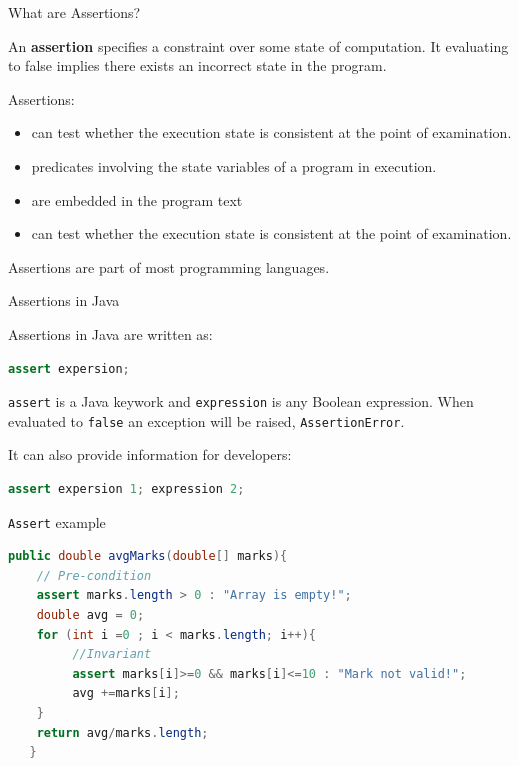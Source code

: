 \documentclass[11pt, xcolor=svgnames]{beamer}
\providecommand{\alert}[1]{\textbf{#1}}
\begin{document}

\begin{frame}{What are Assertions?}

An \alert{assertion} specifies a constraint over some state of computation. It evaluating to false implies there exists an incorrect state in the program.

Assertions: 

\begin{itemize}
  \item can test whether the execution state is consistent at the point of examination.
  \item predicates involving the state variables of a program in execution.
  \item are embedded in the program text
  \item can test whether the execution state is consistent at the point of examination.
\end{itemize}

Assertions are part of most programming languages.

\end{frame}



\begin{frame}[fragile]{Assertions in Java}

Assertions in Java are written as:

\begin{lstlisting}[language=JAVA,basicstyle=\small]
assert expersion;
\end{lstlisting}

\texttt{assert} is a Java keywork and \texttt{expression} is any Boolean expression. When evaluated to \texttt{false} an exception will be raised, \texttt{AssertionError}. 

It can also provide information for developers:

\begin{lstlisting}[language=JAVA,basicstyle=\small]
assert expersion 1; expression 2;
\end{lstlisting}

\end{frame}


\begin{frame}[fragile]{\texttt{Assert} example}

\begin{lstlisting}[language=JAVA,basicstyle=\scriptsize]
  public double avgMarks(double[] marks){
 	// Pre-condition
	assert marks.length > 0 : "Array is empty!";
   	double avg = 0;
   	for (int i =0 ; i < marks.length; i++){
	     //Invariant	
   	     assert marks[i]>=0 && marks[i]<=10 : "Mark not valid!";
   	     avg +=marks[i];
   	}
   	return avg/marks.length;
   }
\end{lstlisting}


\end{frame}
\end{document}
